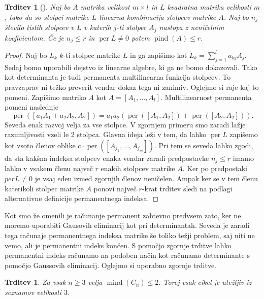 \documentclass[12pt,a4paper,twoside]{article}
\theoremstyle{definition} %
\theoremstyle{plain} %
\newtheorem{trditev}[definicija]{Trditev}
\numberwithin{equation}{section}  %
\DeclareMathOperator{\per}{per}
\DeclareMathOperator{\mind}{mind}
\DeclareMathOperator{\pind}{pind}
\begin{document}
\begin{trditev}[\citet{alg_org}]
\label{pind}
Naj bo $A$ matrika velikost $m \times l$ in $L$ kvadratna matrika velikosti $m$, tako da so stolpci matrike $L$ linearna kombinacija stolpcev matrike $A$. Naj bo $n_j$ število tistih stolpcev v $L$ v katerih $j$-ti stolpec $A_j$ nastopa z neničelnim koeficientom. Če je $n_j \le r$ in $\per L \neq 0$ potem $\pind (A) \le r$.
\end{trditev}
\begin{proof}
Naj bo $L_k$ $k$-ti stolpec matrike $L$ in ga zapišimo kot $L_k = \sum_{j=1}^l a_{kj}A_j$. Sedaj bomo uporabili dejstvo iz linearne algebre, ki ga ne bomo dokazovali. Tako kot determinanta je tudi permanenta multilinearna funkcija stolpcev. To pravzaprav ni težko preverit vendar dokaz tega ni zanimiv. Oglejmo si raje kaj to pomeni. Zapišimo matriko $A$ kot $A = [A_1, \ldots, A_l]$. Multilinearnost permanenta pomeni naslednje
$$ \per([a_1A_1 + a_2A_2, A_2]) = a_1 a_2 \left( \per([A_1, A_2]) + \per([A_2, A_2]) \right).$$
Seveda enak razvoj velja za vse stolpce. V zgornjem primeru smo zaradi lažje razumljivosti vzeli le 2 stolpca. Glavna ideja leži v tem, da lahko $\per L$ zapišemo kot vsoto členov oblike $c \cdot \per([A_{j_1}, \dots, A_{j_m}])$. Pri tem se seveda lahko zgodi, da sta kakšna indeksa stolpcev enaka vendar zaradi predpostavke $n_j \le r$ imamo lahko v vsakem členu največ $r$ enakih stolpcev matrike $A$. Ker po predpostaki $perL \neq 0$ je vsaj eden izmed zgornjih členov neničelen. Ampak ker se v tem členu katerikoli stolpec matrike $A$ ponovi največ $r$-krat trditev sledi na podlagi alternativne definicije permanentnega indeksa.
\end{proof}

Kot smo že omenili je računanje permanent zahtevno predvsem zato, ker ne moremo uporabiti Gausovih eliminacij kot pri determinantah. Seveda je zaradi tega računaje permanentnega indeksa matrike še toliko težji problem, saj niti ne vemo, ali je permanentni indeks končen. S pomočjo zgornje trditve lahko permanentni indeks računamo na podoben način kot računamo determinante s pomočjo  Gaussovih eliminacij. Oglejmo si uporabno zgornje trditve.

\begin{trditev}
\label{list_e_cycle}
Za vsak $n \ge 3$ velja $\mind(C_n) \le 2$. Torej vsak cikel je utežljiv iz seznamov velikosti $3$.
\end{trditev}
\end{document}
